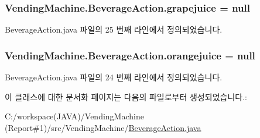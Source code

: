 \subsubsection[{\texorpdfstring{grapejuice}{grapejuice}}]{ Vending\+Machine.\+Beverage\+Action.\+grapejuice = null\hspace{0.3cm}{\ttfamily [private]}}\hypertarget{class_vending_machine_1_1_beverage_action_ad57bdbeb988807b0fb47fd148352930c}{}\label{class_vending_machine_1_1_beverage_action_ad57bdbeb988807b0fb47fd148352930c}


Beverage\+Action.\+java 파일의 25 번째 라인에서 정의되었습니다.

\subsubsection[{\texorpdfstring{orangejuice}{orangejuice}}]{ Vending\+Machine.\+Beverage\+Action.\+orangejuice = null\hspace{0.3cm}{\ttfamily [private]}}\hypertarget{class_vending_machine_1_1_beverage_action_aecab78a26d86ba8dd679e5dda12ccc89}{}\label{class_vending_machine_1_1_beverage_action_aecab78a26d86ba8dd679e5dda12ccc89}


Beverage\+Action.\+java 파일의 24 번째 라인에서 정의되었습니다.



이 클래스에 대한 문서화 페이지는 다음의 파일로부터 생성되었습니다.\+:\begin{DoxyCompactItemize}
\item 
C\+:/workspace(\+J\+A\+V\+A)/\+Vending\+Machine (\+Report\#1)/src/\+Vending\+Machine/\hyperlink{_beverage_action_8java}{Beverage\+Action.\+java}\end{DoxyCompactItemize}
